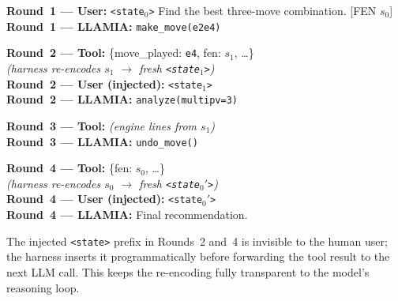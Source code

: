 \begin{tcolorbox}[notebox, title={\texttt{<invoke>} Turn Structure (multi-step planning episode)}]
\small
\textbf{Round~1 --- User:} \texttt{<state$_0$>} Find the best three-move combination. [FEN $s_0$]\\[3pt]
\textbf{Round~1 --- LLAMIA:} \texttt{make\_move(e2e4)}

\tcbline
\textbf{Round~2 --- Tool:} \{move\_played: \texttt{e4}, fen: $s_1$, \ldots\}\\
\textit{(harness re-encodes $s_1$ $\!\to\!$ fresh \texttt{<state$_1$>})}\\[3pt]
\textbf{Round~2 --- User (injected):} \texttt{<state$_1$>}\\[3pt]
\textbf{Round~2 --- LLAMIA:} \texttt{analyze(multipv=3)}

\tcbline
\textbf{Round~3 --- Tool:} \textit{(engine lines from $s_1$)}\\[3pt]
\textbf{Round~3 --- LLAMIA:} \texttt{undo\_move()}

\tcbline
\textbf{Round~4 --- Tool:} \{fen: $s_0$, \ldots\}\\
\textit{(harness re-encodes $s_0$ $\!\to\!$ fresh \texttt{<state$_0'$>})}\\[3pt]
\textbf{Round~4 --- User (injected):} \texttt{<state$_0'$>}\\[3pt]
\textbf{Round~4 --- LLAMIA:} Final recommendation.
\end{tcolorbox}

\noindent The injected \texttt{<state>} prefix in Rounds~2 and~4 is invisible to
the human user; the harness inserts it programmatically before forwarding the
tool result to the next LLM call.
This keeps the re-encoding fully transparent to the model's reasoning loop.

